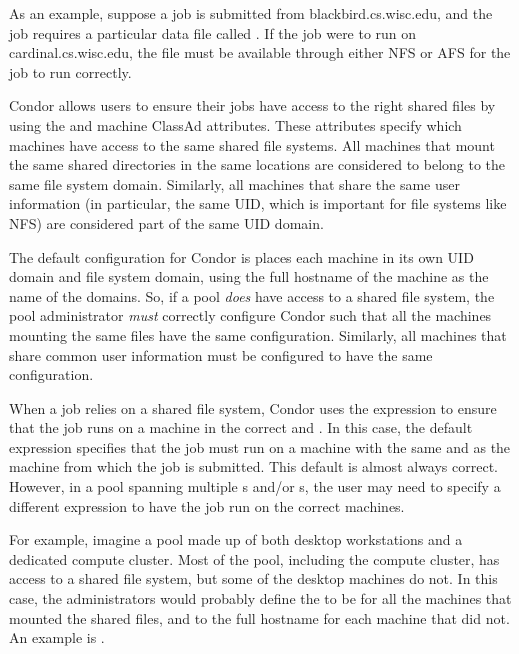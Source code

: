 As an example, suppose a job is submitted from blackbird.cs.wisc.edu,
and the job requires a particular data file called
.  If the job were to run on
cardinal.cs.wisc.edu, the file  must be
available through either NFS or AFS for the job to run correctly.

Condor allows users to ensure their jobs have access to the right
shared files by using the  and
 machine ClassAd attributes.
These attributes specify which machines have access to the same shared
file systems.
All machines that mount the same shared directories in the same
locations are considered to belong to the same file system domain.
Similarly, all machines that share the same user information (in
particular, the same UID, which is important for file systems like
NFS) are considered part of the same UID domain.

The default configuration for Condor is places each machine
in its own UID domain and file system domain, using the full hostname of the
machine as the name of the domains.
So, if a pool \emph{does} have access to a shared file system,
the pool administrator \emph{must} correctly configure Condor 
such that all
the machines mounting the same files have the same
 configuration.
Similarly, all machines that share common user information must be
configured to have the same  configuration.

When a job relies on a shared file system,
Condor uses the
 expression to ensure that the job runs
on a machine in the
correct  and .
In this case, the default  expression specifies
that the job must run on a machine with the same 
and  as the machine from which the job
is submitted.
This default is almost always correct.
However, in a pool spanning multiple s and/or
s, the user may need to specify a different
 expression to have the job run on the correct
machines.

For example, imagine a pool made up of both desktop workstations and a
dedicated compute cluster.
Most of the pool, including the compute cluster, has access to a
shared file system, but some of the desktop machines do not.
In this case, the administrators would probably define the
 to be  for all the machines
that mounted the shared files, and to the full hostname for each
machine that did not. An example is .

